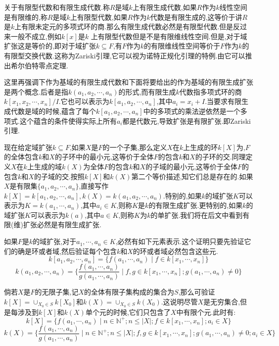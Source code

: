 关于有限型代数和有限生成代数.称$R$是域$k$上有限生成代数,如果$R$作为$k$线性空间是有限维的,称$R$是域$k$上有限型代数,如果$R$作为$k$代数是有限生成的,这等价于讲$R$是$k$上有限未定元的多项式环的商.那么有限生成代数必然是有限型代数.但是反过来一般不成立,例如$k[x]$是$k$ 上有限型代数但是不是有限维线性空间.但是,对于域扩张这是等价的,即对于域扩张$k\subseteq F$,有$F$作为$k$的有限维线性空间等价于$F$作为$k$的有限型交换代数.这称为Zariski引理,它可以视为诺特正规化引理的特例.由它可以推出希尔伯特零点定理.

这里再强调下作为基域的有限生成代数和下面将要给出的作为基域的有限生成扩张是两个概念.后者是指$k(a_1,a_2,\cdots,a_n)$的形式,而有限生成$k$代数指多项式环的商$k[x_1,x_2,\cdots,x_n]/I$.它也可以表示为$k[a_1,a_2,\cdots,a_n]$,其中$a_i=x_i+I$.当要求有限生成代数是域的时候,蕴含了每个$k[a_1,a_2,\cdots,a_n]$中的多项式的乘法逆依然是一个多项式.这个蕴含的条件使得实际上所有$a_i$都是代数元,导致扩张是有限扩张.即Zariski引理.

现在给定域扩张$k\subseteq F$,如果$X$是$F$的一个子集,那么定义$X$在$k$上生成的环$k[X]$为,$F$的全体包含$k$和$X$的子环中的最小元,这等价于全体$F$的包含$k$和$X$的子环的交.同理定义$X$在$k$上生成的域$k(X)$为全体$F$的包含$k$和$X$的子域的最小元,这等价于全体$F$的包含$k$和$X$的子域的交.按照$k[X]$和$k(X)$第二个等价描述,知它们总是存在的.如果$X$是有限集$\{a_1,a_2,\cdots,a_n\}$,直接写作$k[X]=k[a_1,a_2,\cdots,a_n],k(X)=k(a_1,a_2,\cdots,a_n)$.特别的,如果$k$的域扩张$K$可以表示为$K=k(a_1,\cdots,a_n)$,其中$a_i\in K$,则称$K$是$k$的有限生成扩张.更特别的,如果$k$的域扩张$K$可以表示为$k(a)$,其中$a\in K$,则称$K$为$k$的单扩张.我们将在后文中看到有限(维)扩张必然是有限生成扩张.

如果$F$是$k$的域扩张,对于$a_1,\cdots,a_n\in K$,必然有如下元素表示.这个证明只要先验证它们的确是环或者域,然后验证每个包含$k$和$X$的环或者域必然包含这些元.
$$k[a_1,a_2,\cdots,a_n]=\{f(a_1,\cdots,a_n)\mid f\in k[x_1,\cdots,x_n]\}$$
$$k(a_1,a_2,\cdots,a_n)=\{\frac{f(a_1,\cdots,a_n)}{g(a_1,\cdots,a_n)}\mid f,g\in k[x_1,\cdots,x_n];g(a_1,\cdots,a_n)\not=0\}$$

倘若$X$是$F$的无限子集,记$X$的全体有限子集构成的集合为$S$,那么可验证$k[X]=\cup_{X_0\in S}k[X_0]$和$k(X)=\cup_{X_0\in S}k(X_0)$.这说明尽管$X$是无穷集合,但是每涉及到$k[X]$和$k(X)$单个元的时候,它们只包含了$X$中有限个元.此时有:
$$k[X]=\{f(a_1,\cdots,a_n)\mid n\in\mathbb{N}^+;n\le|X|;f\in k[x_1,\cdots,x_n];a_i\in X\}$$
$$k(X)=\{\frac{f(a_1,\cdots,a_n)}{g(a_1,\cdots,a_n)}\mid n\in\mathbb{N}^+;n\le|X|;f,g\in k[x_1,\cdots,x_n];g(a_1,\cdots,a_n)\not=0;a_i\in X\}$$

